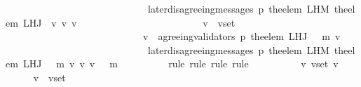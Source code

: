 \begin{isabellebody}
\ \ \ \ \ \ \ \ \ \ \ \ \ \ \ \ \ \ \ \ \ \ \ \ \ \ \ \ {\isasymand}\ later{\isacharunderscore}disagreeing{\isacharunderscore}messages\ {\isacharparenleft}p{\isacharcomma}\ the{\isacharunderscore}elem\ {\isacharparenleft}L{\isacharunderscore}H{\isacharunderscore}M\ {\isacharparenleft}the{\isacharunderscore}elem\ {\isacharparenleft}L{\isacharunderscore}H{\isacharunderscore}J\ {\isasymsigma}\ v{\isacharparenright}{\isacharparenright}\ v{\isacharprime}{\isacharparenright}{\isacharcomma}\ v{\isacharprime}{\isacharcomma}\ {\isasymsigma}{\isacharparenright}\ {\isacharequal}\ {\isasymemptyset}{\isacharparenright}\isanewline
\ \ \ \ \ \ \ \ \ \ \ \ \ \ \ \ \ \ \ \ {\isasymlongrightarrow}\ {\isacharparenleft}{\isasymforall}\ v{\isacharprime}\ {\isasymin}\ v{\isacharunderscore}set{\isacharprime}{\isachardot}\ \isanewline
\ \ \ \ \ \ \ \ \ \ \ \ \ \ \ \ \ \ \ \ \ \ \ \ \ \ \ \ v{\isacharprime}\ {\isasymin}\ agreeing{\isacharunderscore}validators\ {\isacharparenleft}p{\isacharcomma}\ {\isacharparenleft}the{\isacharunderscore}elem\ {\isacharparenleft}L{\isacharunderscore}H{\isacharunderscore}J\ {\isacharparenleft}{\isasymsigma}\ {\isasymunion}\ {\isacharbraceleft}m{\isacharbraceright}{\isacharparenright}\ v{\isacharparenright}{\isacharparenright}{\isacharparenright}\isanewline
\ \ \ \ \ \ \ \ \ \ \ \ \ \ \ \ \ \ \ \ \ \ \ \ \ \ \ \ {\isasymand}\ later{\isacharunderscore}disagreeing{\isacharunderscore}messages\ {\isacharparenleft}p{\isacharcomma}\ the{\isacharunderscore}elem\ {\isacharparenleft}L{\isacharunderscore}H{\isacharunderscore}M\ {\isacharparenleft}the{\isacharunderscore}elem\ {\isacharparenleft}L{\isacharunderscore}H{\isacharunderscore}J\ {\isacharparenleft}{\isasymsigma}\ {\isasymunion}\ {\isacharbraceleft}m{\isacharbraceright}{\isacharparenright}\ v{\isacharparenright}{\isacharparenright}\ v{\isacharprime}{\isacharparenright}{\isacharcomma}\ v{\isacharprime}{\isacharcomma}\ {\isacharparenleft}{\isasymsigma}\ {\isasymunion}\ {\isacharbraceleft}m{\isacharbraceright}{\isacharparenright}{\isacharparenright}\ {\isacharequal}\ {\isasymemptyset}{\isacharparenright}{\isacharparenright}{\isachardoublequoteclose}\ \ \isanewline
\ \ \ \ \isamarkupfalse%
\ {\isacharparenleft}rule{\isacharcomma}\ rule{\isacharcomma}\ rule{\isacharcomma}\ rule{\isacharparenright}\isanewline
\ \ \isamarkupfalse%
\ {\isacharminus}\isanewline
\ \ \ \ \isamarkupfalse%
\ v\ v{\isacharunderscore}set{\isacharprime}\ v{\isacharprime}\isanewline
\ \ \ \ \isamarkupfalse%
\ {\isachardoublequoteopen}v\ {\isasymin}\ v{\isacharunderscore}set{\isachardoublequoteclose}\ \isanewline

\end{isabellebody}
